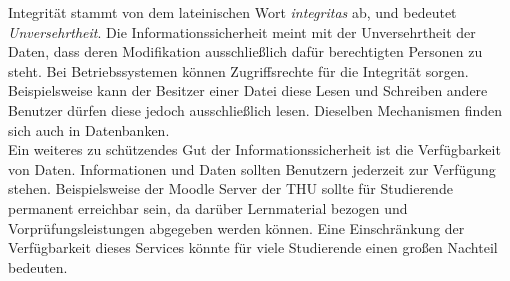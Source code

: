 \documentclass[
    12pt, %
    DIV10,
    ngerman, %
    a4paper, %
    oneside, %
    titlepage, %
    parskip=half, %
    headings=normal, %
    listof=totoc, %
    bibliography=totoc, %
    index=totoc, %
    captions=tableheading, %
    final %
]{scrreprt}
\begin{document}
Integrität stammt von dem lateinischen Wort \emph{integritas} ab, und bedeutet \emph{Unversehrtheit}. Die Informationssicherheit meint mit der Unversehrtheit der Daten, dass deren Modifikation ausschließlich dafür berechtigten Personen zu steht. Bei Betriebssystemen können Zugriffsrechte für die Integrität sorgen. Beispielsweise kann der Besitzer einer Datei diese Lesen und Schreiben andere Benutzer dürfen diese jedoch ausschließlich lesen. Dieselben Mechanismen finden sich auch in Datenbanken.\\
Ein weiteres zu schützendes Gut der Informationssicherheit ist die Verfügbarkeit von Daten. Informationen und Daten sollten Benutzern jederzeit zur Verfügung stehen. Beispielsweise der Moodle Server der THU sollte für Studierende permanent erreichbar sein, da darüber Lernmaterial bezogen und Vorprüfungsleistungen abgegeben werden können. Eine Einschränkung der Verfügbarkeit dieses Services könnte für viele Studierende einen großen Nachteil bedeuten.\\\\
\end{document}
